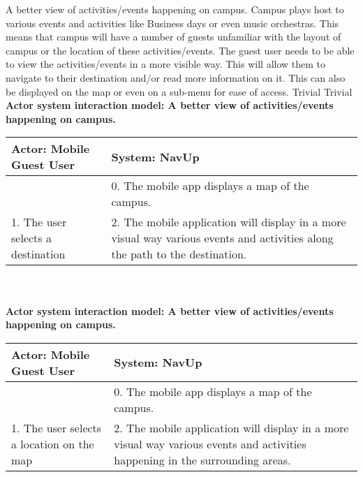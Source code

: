 \FuncReq
{A better view of activities/events happening on campus.}
{Campus plays host to various events and activities like Business days or even music orchestras. This means that campus will have a number of guests unfamiliar with the layout of campus or the location of these activities/events. The guest user needs to be able to view the activities/events in a more visible way. This will allow them to navigate to their destination and/or read more information on it. This can also be displayed on the map or even on a sub-menu for ease of access.}
{Trivial}
{Trivial}
\\
\textbf{Actor system interaction model: A better view of activities/events happening on campus.}\\
\begin{tabular}{ | p{6cm} | p{6cm} |}
\hline
Actor: Mobile Guest User & System: NavUp \\ \hline
& 0. The mobile app displays a map of the campus.\\ \hline
1. The user selects a destination & 2. The mobile application will display in a more visual way various events and activities along the path to the destination.\\ \hline
\end{tabular}
\\
\bigskip
\\    
\textbf{Actor system interaction model: A better view of activities/events happening on campus. }\\
\begin{tabular}{ | p{6cm} | p{6cm} |}
\hline
Actor: Mobile Guest User & System: NavUp \\ \hline
& 0. The mobile app displays a map of the campus.\\ \hline
1. The user selects a location on the map & 2. The mobile application will display in a more visual way various events and activities happening in the surrounding areas.\\ \hline
\end{tabular}
\\
\bigskip


